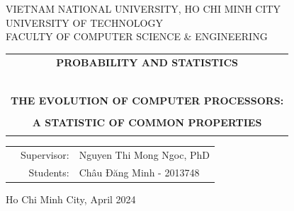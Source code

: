 \documentclass[a4paper]{report}
\begin{document}
\begin{titlepage}
  \begin{center}
    VIETNAM NATIONAL UNIVERSITY, HO CHI MINH CITY\\
    UNIVERSITY OF TECHNOLOGY \\
    FACULTY OF COMPUTER SCIENCE \& ENGINEERING
  \end{center}

  \vspace{1cm}


  \vspace{1cm}


  \begin{center}
    \begin{tabular}{c}
      \textbf{{\Large PROBABILITY AND STATISTICS}}          \\
      ~~                                                    \\
      \hline
      \\
      \textbf{\large THE EVOLUTION OF COMPUTER PROCESSORS:} \\
      \\
      \textbf{\large A STATISTIC OF COMMON PROPERTIES}      \\
      \\
      \hline
    \end{tabular}
  \end{center}

  \vspace{1.5cm}

  \begin{table}[h]
    \begin{tabular}{rrl}
      \hspace{5 cm} & Supervisor: & Nguyen Thi Mong Ngoc, PhD \\

                    & Students:   & Châu Đăng Minh - 2013748
    \end{tabular}
  \end{table}
  \vspace{1.5cm}
  \begin{center}
    {\footnotesize Ho Chi Minh City, April 2024}
  \end{center}
\end{titlepage}

\tableofcontents




\end{document}
